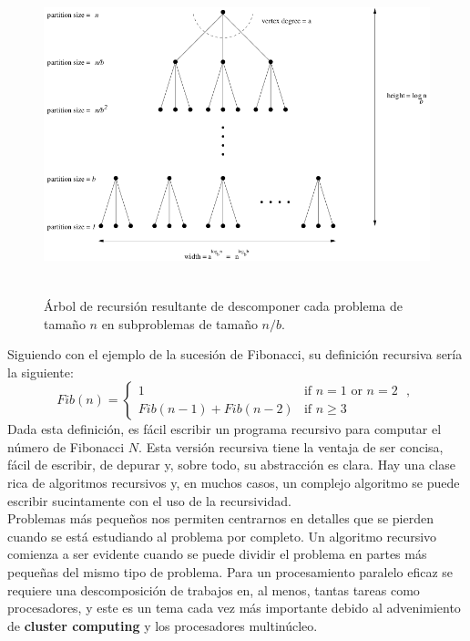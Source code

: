 \begin{figure}[!ht]
\begin{center}
\includegraphics[width=400pt,height=262pt]{images/recursion-tree.png}
\end{center}
\caption{Árbol de recursión resultante de descomponer cada problema de tamaño $n$ en subproblemas de tamaño $n/b$.}
\label{recursion_tree}
\end{figure}

Siguiendo con el ejemplo de la sucesión de Fibonacci, su definición recursiva sería la siguiente:
\begin{equation} \label{def-fib} \end{equation}
\[ Fib(n) = \left\{ \begin{array}{ll}
         1 & \mbox{if $n = 1$ or $n = 2$ },\\
         Fib(n-1) + Fib(n-2) & \mbox{if $n \geq 3$} \end{array} \right.
\]
Dada esta definición, es fácil escribir un programa recursivo para computar el número de Fibonacci $N$.
Esta versión recursiva tiene la ventaja de ser concisa, fácil de escribir, de depurar y, sobre todo, su abstracción es clara. Hay una clase
rica de algoritmos recursivos y, en muchos casos, un complejo algoritmo se puede escribir sucintamente con el uso de la recursividad.\\

Problemas más pequeños nos permiten centrarnos en detalles que se pierden cuando se está estudiando al problema por completo. Un algoritmo
recursivo comienza a ser evidente cuando se puede dividir el problema en partes más pequeñas del mismo tipo de problema. Para un
procesamiento paralelo eficaz se requiere una descomposición de trabajos en, al menos, tantas tareas como procesadores, y este es un tema
cada vez más importante debido al advenimiento de \textbf{cluster computing} y los procesadores multinúcleo\cite{skiena08}.

